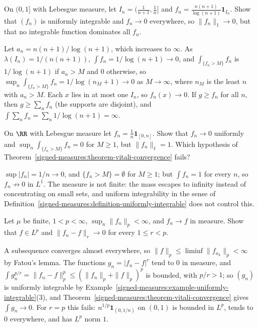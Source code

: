 \begin{exercise}\label{signed-measures:exercise-not-dominated}
On $(0, 1]$ with Lebesgue measure, let $I_n = (\frac1{n+1}, \frac1n]$ and $f_n = \frac{n(n + 1)}{\log(n + 1)}\mathbf{1}_{I_n}$. Show that $(f_n)$ is uniformly integrable and $f_n \to 0$ everywhere, so
$\|f_n\|_1 \to 0$, but that no integrable function dominates all $f_n$.
\end{exercise}

\begin{solution}
Let $a_n = n(n + 1)/\log(n + 1)$, which increases to $\infty$. As $\lambda(I_n) = 1/(n(n + 1))$, $\int f_n = 1/\log(n + 1) \to 0$, and $\int_{\{f_n > M\}}f_n$ is $1/\log(n + 1)$ if $a_n > M$ and $0$
otherwise, so $\sup_n\int_{\{f_n > M\}}f_n = 1/\log(n_M + 1) \to 0$ as $M \to \infty$, where $n_M$ is the least $n$ with $a_n > M$. Each $x$ lies in at most one $I_n$, so $f_n(x) \to 0$. If
$g \geq f_n$ for all $n$, then $g \geq \sum_nf_n$ (the supports are disjoint), and $\int\sum_nf_n = \sum_n1/\log(n + 1) = \infty$.
\end{solution}

\begin{exercise}\label{signed-measures:exercise-vitali-infinite}
On $\RR$ with Lebesgue measure let $f_n = \frac1n\mathbf{1}_{[0, n]}$. Show that $f_n \to 0$ uniformly and $\sup_n\int_{\{f_n > M\}}f_n = 0$ for $M \geq 1$, but $\|f_n\|_1 = 1$. Which hypothesis of
Theorem~\ref{signed-measures:theorem-vitali-convergence} fails?
\end{exercise}

\begin{solution}
$\sup|f_n| = 1/n \to 0$, and $\{f_n > M\} = \emptyset$ for $M \geq 1$; but $\int f_n = 1$ for every $n$, so $f_n \not\to 0$ in $L^1$. The measure is not finite: the mass escapes to infinity instead of
concentrating on small sets, and uniform integrability in the sense of Definition~\ref{signed-measures:definition-uniformly-integrable} does not control this.
\end{solution}

\begin{exercise}\label{signed-measures:exercise-lr-convergence}
Let $\mu$ be finite, $1 < p < \infty$, $\sup_n\|f_n\|_p < \infty$, and $f_n \to f$ in measure. Show that $f \in L^p$ and $\|f_n - f\|_r \to 0$ for every $1 \leq r < p$.
\end{exercise}

\begin{solution}
A subsequence converges almost everywhere, so $\|f\|_p \leq \liminf\|f_{n_k}\|_p < \infty$ by Fatou's lemma. The functions $g_n = |f_n - f|^r$ tend to $0$ in measure, and
$\int g_n^{p/r} = \|f_n - f\|_p^p \leq (\|f_n\|_p + \|f\|_p)^p$ is bounded, with $p/r > 1$; so $(g_n)$ is uniformly integrable by Example~\ref{signed-measures:example-uniformly-integrable}(3), and
Theorem~\ref{signed-measures:theorem-vitali-convergence} gives $\int g_n \to 0$. For $r = p$ this fails: $n^{1/p}\mathbf{1}_{(0, 1/n)}$ on $(0, 1)$ is bounded in $L^p$, tends to $0$ everywhere, and has
$L^p$ norm $1$.
\end{solution}

